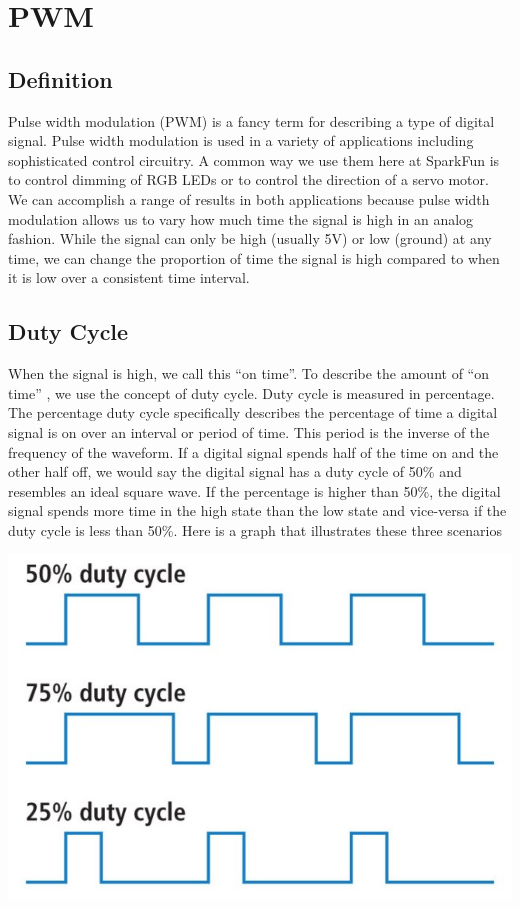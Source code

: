 \section{PWM}


\subsection{Definition}
Pulse width modulation (PWM) is a fancy term for describing a type of digital signal. Pulse width modulation is used in a variety of applications including sophisticated control circuitry. A common way we use them here at SparkFun is to control dimming of RGB LEDs or to control the direction of a servo motor. We can accomplish a range of results in both applications because pulse width modulation allows us to vary how much time the signal is high in an analog fashion. While the signal can only be high (usually 5V) or low (ground) at any time, we can change the proportion of time the signal is high compared to when it is low over a consistent time interval.

\newpage
\subsection{Duty Cycle}
When the signal is high, we call this “on time”. To describe the amount of “on time” , we use the concept of duty cycle. Duty cycle is measured in percentage. The percentage duty cycle specifically describes the percentage of time a digital signal is on over an interval or period of time. This period is the inverse of the frequency of the waveform.
If a digital signal spends half of the time on and the other half off, we would say the digital signal has a duty cycle of 50\% and resembles an ideal square wave. If the percentage is higher than 50\%, the digital signal spends more time in the high state than the low state and vice-versa if the duty cycle is less than 50\%. Here is a graph that illustrates these three scenarios \\

\centerline{
	\includegraphics[width=1.0\textwidth]{overview/images/duty.jpg}
}

